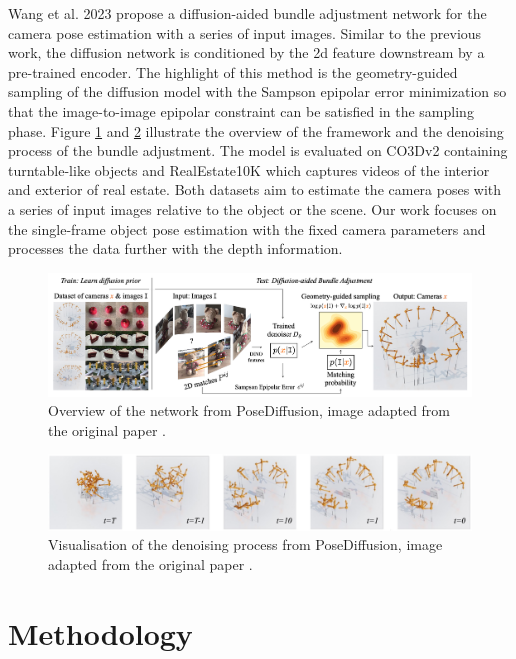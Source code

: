 \documentclass[12pt,DIV14,BCOR12mm,a4paper,footinclude=false,headinclude,parskip=half-,twoside,openright,cleardoublepage=empty,toc=index,bibliography=totoc,listof=totoc]{scrreprt}
\numberwithin{equation}{chapter}
\begin{document}
Wang et al. 2023 \cite{wang2023pd} propose a diffusion-aided bundle adjustment network for the camera pose estimation with a series of input images. Similar to the previous work, the diffusion network is conditioned by the \gls{2d} feature downstream by a pre-trained encoder. The highlight of this method is the geometry-guided sampling of the diffusion model with the Sampson epipolar error minimization so that the image-to-image epipolar constraint can be satisfied in the sampling phase. Figure \ref{img:pose_diff} and \ref{img:pose_diff_vis} illustrate the overview of the framework and the denoising process of the bundle adjustment. The model is evaluated on CO3Dv2 \cite{reizenstein2021common} containing turntable-like objects and RealEstate10K \cite{zhou2018stereo} which captures videos of the interior and exterior of real estate. Both datasets aim to estimate the camera poses with a series of input images relative to the object or the scene. Our work focuses on the single-frame object pose estimation with the fixed camera parameters and processes the data further with the depth information.

\begin{figure}[h]
	\centering
	\includegraphics[width=1.\textwidth]{img/pose_diff.png}
	\caption{Overview of the network from PoseDiffusion, image adapted from the original paper \cite{wang2023pd}.}
	\label{img:pose_diff}
\end{figure}

\begin{figure}[h]
	\centering
	\includegraphics[width=1.\textwidth]{img/pose_diff_vis.pdf}
	\caption{Visualisation of the denoising process from PoseDiffusion, image adapted from the original paper \cite{wang2023pd}.}
	\label{img:pose_diff_vis}
\end{figure}

\chapter{Methodology}
\end{document}
